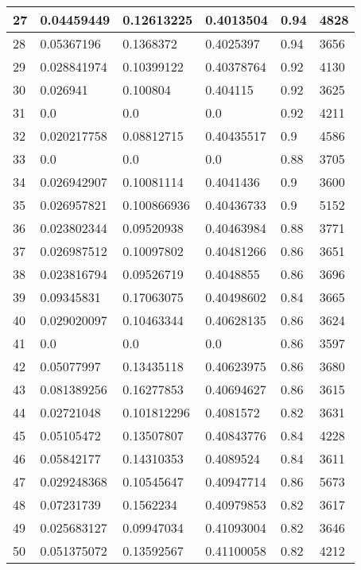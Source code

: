 \begin{longtable}{|l|l|l|l|l|l|}
27 & 0.04459449 & 0.12613225 & 0.4013504 & 0.94 & 4828 \\ \hline 
28 & 0.05367196 & 0.1368372 & 0.4025397 & 0.94 & 3656 \\ \hline 
29 & 0.028841974 & 0.10399122 & 0.40378764 & 0.92 & 4130 \\ \hline 
30 & 0.026941 & 0.100804 & 0.404115 & 0.92 & 3625 \\ \hline 
31 & 0.0 & 0.0 & 0.0 & 0.92 & 4211 \\ \hline 
32 & 0.020217758 & 0.08812715 & 0.40435517 & 0.9 & 4586 \\ \hline 
33 & 0.0 & 0.0 & 0.0 & 0.88 & 3705 \\ \hline 
34 & 0.026942907 & 0.10081114 & 0.4041436 & 0.9 & 3600 \\ \hline 
35 & 0.026957821 & 0.100866936 & 0.40436733 & 0.9 & 5152 \\ \hline 
36 & 0.023802344 & 0.09520938 & 0.40463984 & 0.88 & 3771 \\ \hline 
37 & 0.026987512 & 0.10097802 & 0.40481266 & 0.86 & 3651 \\ \hline 
38 & 0.023816794 & 0.09526719 & 0.4048855 & 0.86 & 3696 \\ \hline 
39 & 0.09345831 & 0.17063075 & 0.40498602 & 0.84 & 3665 \\ \hline 
40 & 0.029020097 & 0.10463344 & 0.40628135 & 0.86 & 3624 \\ \hline 
41 & 0.0 & 0.0 & 0.0 & 0.86 & 3597 \\ \hline 
42 & 0.05077997 & 0.13435118 & 0.40623975 & 0.86 & 3680 \\ \hline 
43 & 0.081389256 & 0.16277853 & 0.40694627 & 0.86 & 3615 \\ \hline 
44 & 0.02721048 & 0.101812296 & 0.4081572 & 0.82 & 3631 \\ \hline 
45 & 0.05105472 & 0.13507807 & 0.40843776 & 0.84 & 4228 \\ \hline 
46 & 0.05842177 & 0.14310353 & 0.4089524 & 0.84 & 3611 \\ \hline 
47 & 0.029248368 & 0.10545647 & 0.40947714 & 0.86 & 5673 \\ \hline 
48 & 0.07231739 & 0.1562234 & 0.40979853 & 0.82 & 3617 \\ \hline 
49 & 0.025683127 & 0.09947034 & 0.41093004 & 0.82 & 3646 \\ \hline 
50 & 0.051375072 & 0.13592567 & 0.41100058 & 0.82 & 4212 \\ \hline 
\end{longtable}